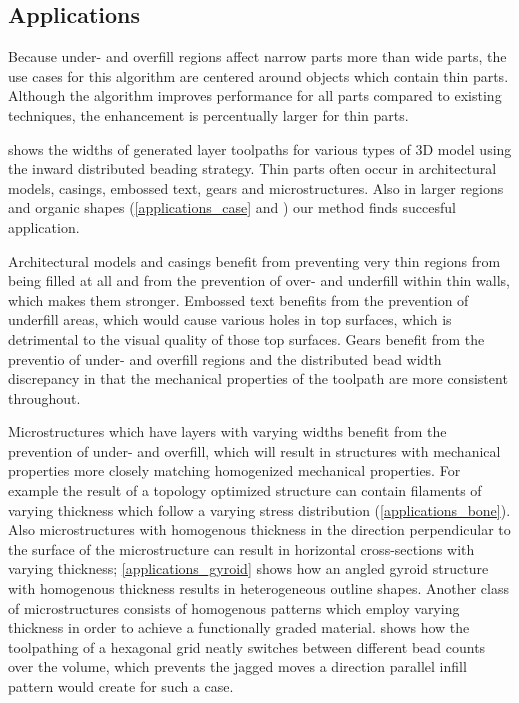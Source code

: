 \subsection{Applications}
Because under- and overfill regions affect narrow parts more than wide parts, the use cases for this algorithm are centered around objects which contain thin parts.
Although the algorithm improves performance for all parts compared to existing techniques, the enhancement is percentually larger for thin parts.


 shows the widths of generated layer toolpaths for various types of 3D model using the inward distributed beading strategy.
Thin parts often occur in architectural models, casings, embossed text, gears and microstructures.
Also in larger regions and organic shapes (\cref{applications_case} and ) our method finds succesful application.

Architectural models and casings benefit from preventing very thin regions from being filled at all and from the prevention of over- and underfill within thin walls, which makes them stronger.
Embossed text benefits from the prevention of underfill areas, which would cause various holes in top surfaces, which is detrimental to the visual quality of those top surfaces.
Gears benefit from the preventio of under- and overfill regions and the distributed bead width discrepancy in that the mechanical properties of the toolpath are more consistent throughout.

Microstructures which have layers with varying widths benefit from the prevention of under- and overfill, which will result in structures with mechanical properties more closely matching homogenized mechanical properties.
For example the result of a topology optimized structure can contain filaments of varying thickness \cite{wu2017infill} which follow a varying stress distribution (\cref{applications_bone}).
Also microstructures with homogenous thickness in the direction perpendicular to the surface of the microstructure can result in horizontal cross-sections with varying thickness;
\cref{applications_gyroid} shows how an angled gyroid structure with homogenous thickness results in heterogeneous outline shapes.
Another class of microstructures consists of homogenous patterns which employ varying thickness in order to achieve a functionally graded material.
 shows how the toolpathing of a hexagonal grid neatly switches between different bead counts over the volume, which prevents the jagged moves a direction parallel infill pattern would create for such a case. \cite{bates2018compressive}


